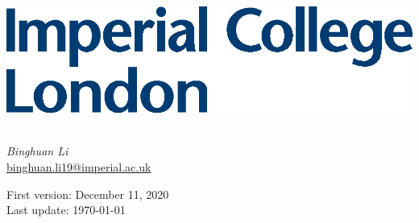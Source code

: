 
\begin{titlepage}
\Large

\begin{minipage}{0.4\textwidth}
    \includegraphics[width=\textwidth]{images/Imperial.eps}
\end{minipage}

\vspace{1.5cm}

\begin{center}
        \vspace{2cm}
        {\Huge \textbf{\textit{\doc}}}\\
        \vspace{5cm}
        \textit{Binghuan Li}\\
        \href{mailto:binghuan.li19@imperial.ac.uk}{binghuan.li19@imperial.ac.uk}

        \vspace{3cm}
        First version: December 11, 2020 \\
        Last update: \today
        \vfill
\end{center}

\end{titlepage}